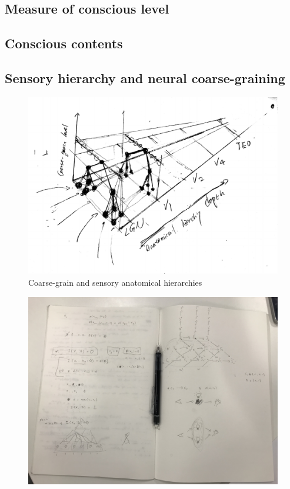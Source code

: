 \documentclass[utf8]{article}
\begin{document}
		
		\subsection{Measure of conscious level}
		\subsection{Conscious contents}
		\subsection{Sensory hierarchy and neural coarse-graining
			}
		
		

			\begin{figure}[h]
				\includegraphics[width=\textwidth]{hierarchy.pdf}
				{Coarse-grain and sensory anatomical hierarchies}
				\label{fig:hierarchy}
			\end{figure}
		
		
			\begin{figure}[h]
				\includegraphics[width=\textwidth]{WritingMaterials/HierachyDiscussion (1).jpg}
			\end{figure}		
\end{document}
